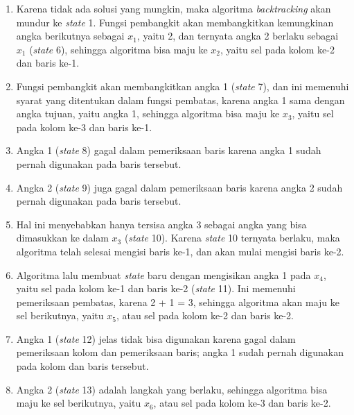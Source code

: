 \begin{enumerate}
\item Karena tidak ada solusi yang mungkin, maka algoritma \textit{backtracking} akan mundur ke \textit{state} 1. Fungsi pembangkit akan membangkitkan kemungkinan angka berikutnya sebagai \begin{math}x_1\end{math}, yaitu 2, dan ternyata angka 2 berlaku sebagai \begin{math}x_1\end{math} (\textit{state} 6), sehingga algoritma bisa maju ke \begin{math}x_2\end{math}, yaitu sel pada kolom ke-2 dan baris ke-1.
\item Fungsi pembangkit akan membangkitkan angka 1 (\textit{state} 7), dan ini memenuhi syarat yang ditentukan dalam fungsi pembatas, karena angka 1 sama dengan angka tujuan, yaitu angka 1, sehingga algoritma bisa maju ke \begin{math}x_3\end{math}, yaitu sel pada kolom ke-3 dan baris ke-1.
\item Angka 1 (\textit{state} 8) gagal dalam pemeriksaan baris karena angka 1 sudah pernah digunakan pada baris tersebut.
\item Angka 2 (\textit{state} 9) juga gagal dalam pemeriksaan baris karena angka 2 sudah pernah digunakan pada baris tersebut.
\item Hal ini menyebabkan hanya tersisa angka 3 sebagai angka yang bisa dimasukkan ke dalam \begin{math}x_3\end{math} (\textit{state} 10). Karena \textit{state} 10 ternyata berlaku, maka algoritma telah selesai mengisi baris ke-1, dan akan mulai mengisi baris ke-2.
\item Algoritma lalu membuat \textit{state} baru dengan mengisikan angka 1 pada \begin{math}x_4\end{math}, yaitu sel pada kolom ke-1 dan baris ke-2 (\textit{state} 11). Ini memenuhi pemeriksaan pembatas, karena 2 + 1 = 3, sehingga algoritma akan maju ke sel berikutnya, yaitu \begin{math}x_5\end{math}, atau sel pada kolom ke-2 dan baris ke-2.
\item Angka 1 (\textit{state} 12) jelas tidak bisa digunakan karena gagal dalam pemeriksaan kolom dan pemeriksaan baris; angka 1 sudah pernah digunakan pada kolom dan baris tersebut.
\item Angka 2 (\textit{state} 13) adalah langkah yang berlaku, sehingga algoritma bisa maju ke sel berikutnya, yaitu \begin{math}x_6\end{math}, atau sel pada kolom ke-3 dan baris ke-2.

\end{enumerate}
